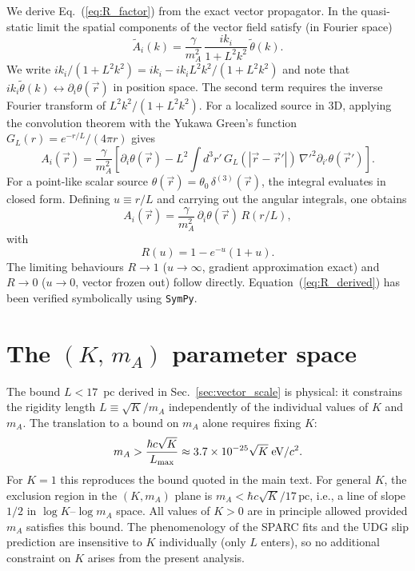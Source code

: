\documentclass[aps,prd,reprint,floatfix,nofootinbib,superscriptaddress]{revtex4-2}
\begin{document}
We derive Eq.~(\ref{eq:R_factor}) from the exact vector propagator.
In the quasi-static limit the spatial components of the vector field
satisfy (in Fourier space)
\begin{equation}
  \tilde A_i(k) = \frac{\gamma}{m_A^2}\,
                  \frac{ik_i}{1+L^2k^2}\,\tilde\theta(k).
\end{equation}
We write $ik_i/(1+L^2k^2) = ik_i - ik_i L^2k^2/(1+L^2k^2)$ and
note that $ik_i\tilde\theta(k) \leftrightarrow \partial_i\theta(\vec r)$
in position space. The second term requires the inverse Fourier
transform of $L^2 k^2 / (1+L^2 k^2)$. For a localized source in
3D, applying the convolution theorem with the Yukawa Green's function
$G_L(r) = e^{-r/L}/(4\pi r)$ gives
\begin{equation}
  A_i(\vec r) = \frac{\gamma}{m_A^2}\left[
    \partial_i\theta(\vec r)
    - L^2 \int d^3r'\,G_L(|\vec r - \vec r'|)\,
      \nabla'^2\partial_{i'}\theta(\vec r')
  \right].
\end{equation}
For a point-like scalar source $\theta(\vec r) = \theta_0\,\delta^{(3)}(\vec r)$,
the integral evaluates in closed form. Defining
$u \equiv r/L$ and carrying out the angular integrals, one obtains
\begin{equation}
  A_i(\vec r) = \frac{\gamma}{m_A^2}\,\partial_i\theta(\vec r)\,
                R(r/L),
\end{equation}
with
\begin{equation}
  R(u) = 1 - e^{-u}(1 + u).
  \label{eq:R_derived}
\end{equation}
The limiting behaviours $R\to 1$ ($u\to\infty$, gradient approximation
exact) and $R\to 0$ ($u\to 0$, vector frozen out) follow directly.
Equation~(\ref{eq:R_derived}) has been verified symbolically using
\texttt{SymPy}.

\section{The $(K,\,m_A)$ parameter space}
\label{app:KmA}

The bound $L < 17$~pc derived in Sec.~\ref{sec:vector_scale} is
physical: it constrains the rigidity length $L \equiv \sqrt{K}/m_A$
independently of the individual values of $K$ and $m_A$. The
translation to a bound on $m_A$ alone requires fixing $K$:
\begin{equation}
  m_A > \frac{\hbar c \sqrt{K}}{L_{\rm max}}
  \approx 3.7\times10^{-25}\sqrt{K}\;\text{eV}/c^2.
\end{equation}
For $K = 1$ this reproduces the bound quoted in the main text.
For general $K$, the exclusion region in the $(K, m_A)$ plane is
$m_A < \hbar c\sqrt{K}/17\,\text{pc}$, i.e., a line of slope $1/2$
in $\log K$--$\log m_A$ space. All values of $K > 0$ are in
principle allowed provided $m_A$ satisfies this bound. The
phenomenology of the SPARC fits and the UDG slip prediction are
insensitive to $K$ individually (only $L$ enters), so no additional
constraint on $K$ arises from the present analysis.
\end{document}
